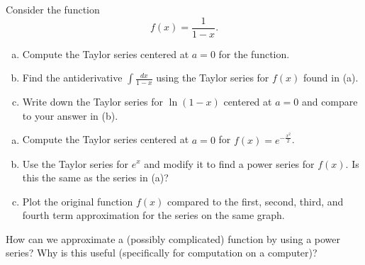 \documentclass[12pt]{article} %
\begin{document}
\begin{problem} Consider the function
\[
f(x)=\frac{1}{1-x}.
\]
\begin{enumerate}[(a)]
    \item Compute the Taylor series centered at $a=0$ for the function.
    \item Find the antiderivative $\int \frac{dx}{1-x}$ using the Taylor series for $f(x)$ found in (a).  
    \item Write down the Taylor series for $\ln(1-x)$ centered at $a=0$ and compare to your answer in (b).
\end{enumerate}
\end{problem}

\begin{problem}
\begin{enumerate}[(a)]
    \item Compute the Taylor series centered at $a=0$ for $f(x)=e^{-\frac{x^2}{2}}$.
    \item Use the Taylor series for $e^x$ and modify it to find a power series for $f(x)$. Is this the same as the series in (a)?
    \item Plot the original function $f(x)$ compared to the first, second, third, and fourth term approximation for the series on the same graph.
\end{enumerate}
\end{problem}

\begin{problem}
How can we approximate a (possibly complicated) function by using a power series? Why is this useful (specifically for computation on a computer)?
\end{problem}
\end{document}
